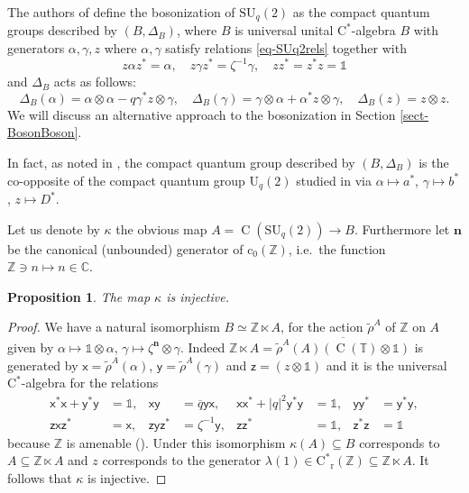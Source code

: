 \documentclass[12pt,reqno,a4paper]{amsart}
\newtheorem{proposition}{Proposition}[section]
\theoremstyle{definition}
\newcommand{\cst}{\ensuremath{\mathrm{C}^*}}
\newcommand{\I}{\mathds{1}}
\newcommand{\tens}{\otimes}
\newcommand{\CC}{\mathbb{C}}
\newcommand{\TT}{\mathbb{T}}
\newcommand{\ZZ}{\mathbb{Z}}
\newcommand{\bn}{{\boldsymbol{n}}}
\DeclareMathOperator{\C}{C}
\newcommand{\SU}{\mathrm{SU}}
\newcommand{\kmap}{\kappa}
\numberwithin{equation}{section}
\begin{document}
The authors of \cite{BraidedSU2} define the bosonization of $\SU_q(2)$ as the compact quantum groups described by $(B,\Delta_B)$, where $B$ is universal unital \cst-algebra $B$ with generators $\alpha,\gamma,z$ where $\alpha,\gamma$ satisfy relations \eqref{eq-SUq2rels} together with
\[
z\alpha z^*=\alpha,\quad
z\gamma z^*=\zeta^{-1}\gamma,\quad
zz^*=z^*z=\I
\]
and $\Delta_B$ acts as follows:
\begin{equation}\label{eq-eq32}
\Delta_B(\alpha)=\alpha\tens\alpha-q\gamma^*z\tens\gamma,\quad
\Delta_B(\gamma)=\gamma\tens\alpha+\alpha^*z\tens\gamma,\quad
\Delta_B(z)=z\tens z.
\end{equation}
We will discuss an alternative approach to the bosonization in Section \ref{sect-BosonBoson}.

In fact, as noted in \cite[Section 6]{BraidedSU2}, the compact quantum group described by $(B,\Delta_B)$ is the co-opposite of the compact quantum group $\mathrm{U}_q(2)$ studied in \cite{ZhangZhao} via $\alpha\mapsto a^*$, $\gamma\mapsto b^*$, $z\mapsto D^*$.

Let us denote by $\kmap$ the obvious map $A=\C(\SU_q(2))\to B$. Furthermore let $\bn$ be the canonical (unbounded) generator of $\mathrm{c}_0(\ZZ)$, i.e.~the function $\ZZ\ni n\mapsto n\in\CC$.

\begin{proposition}\label{prop-injkap}
The map $\kmap$ is injective.
\end{proposition}

\begin{proof}
We have a natural isomorphism $B\simeq \ZZ\ltimes A$, for the action $\tilde{\rho}^{A}$ of $\ZZ$ on $A$ given by $\alpha\mapsto \I\tens\alpha$, $\gamma\mapsto\zeta^\bn\tens\gamma$. Indeed $\ZZ\ltimes A=\overline{\tilde{\rho}^A(A)(\C(\TT)\tens\I)}$ is generated by $\mathsf{x}=\tilde{\rho}^A(\alpha)$, $\mathsf{y}=\tilde{\rho}^A(\gamma)$ and $\mathsf{z}=(z\tens\I)$ and it is the universal \cst-algebra for the relations
\begin{align*}
\mathsf{x}^*\mathsf{x}+\mathsf{y}^*\mathsf{y}&=\I,&\mathsf{x}\mathsf{y}&=\overline{q}\mathsf{y}\mathsf{x},
&\mathsf{x}\mathsf{x}^*+|q|^2\mathsf{y}^*\mathsf{y}&=\I,&\mathsf{y}\mathsf{y}^*&=\mathsf{y}^*\mathsf{y},\\
\mathsf{z}\mathsf{x}\mathsf{z}^*&=\mathsf{x},
&\mathsf{z}\mathsf{y}\mathsf{z}^*&=\zeta^{-1}\mathsf{y},
&\mathsf{z}\mathsf{z}^*&=\I,&\mathsf{z}^*\mathsf{z}&=\I
\end{align*}
because $\ZZ$ is amenable (\cite[Theorem 7.13]{Williams}). Under this isomorphism $\kmap(A)\subseteq B$ corresponds to $A\subseteq \ZZ\ltimes A$ and $z$ corresponds to the generator $\lambda(1)\in\cst_{\text{r}}(\ZZ)\subseteq \ZZ\ltimes A$. It follows that $\kmap$ is injective.
\end{proof}
\end{document}
